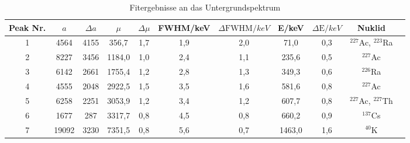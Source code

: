 \begin{table}[h]
\small
\centering
\caption{Fitergebnisse an das Untergrundspektrum}
\begin{tabular}{ccccccccccc}
\toprule
Peak Nr. & $a$ & $\Delta a$ & $\mu$ & $\Delta \mu$ & FWHM/\si{keV} & $\Delta \text{FWHM}/\si{keV}$& E/\si{keV}& $\Delta\text{E}/\si{keV}$ & Nuklid\\
\midrule 
1	&	4564	&	4155	&	356,7	&	1,7	&	1,9	&	2,0	&	71,0	&	0,3	&	$^{227}$Ac, $^{223}$Ra\\
2	&	8227	&	3456	&	1184,0	&	1,0	&	2,4	&	1,1	&	235,6	&	0,5	&	$^{227}$Ac\\
3	&	6142	&	2661	&	1755,4	&	1,2	&	2,8	&	1,3	&	349,3	&	0,6	&	$^{226}$Ra \\
4	&	4555	&	2048	&	2922,5	&	1,5	&	3,5	&	1,6	&	581,6	&	0,8	&	$^{227}$Ac \\
5	&	6258	&	2251	&	3053,9	&	1,2	&	3,4	&	1,2	&	607,7	&	0,8	&	$^{227}$Ac, $^{227}$Th\\
6	&	1677	&	287	&	3317,7	&	0,8	&	4,5	&	0,8	&	660,2	&	0,9	&	$^{137}$Cs \\
7	&	19092	&	3230	&	7351,5	&	0,8	&	5,6	&	0,7	&	1463,0	&	1,6	&	$^{40}$K \\
\bottomrule
\end{tabular}
\label{tab:ge}
\end{table}
